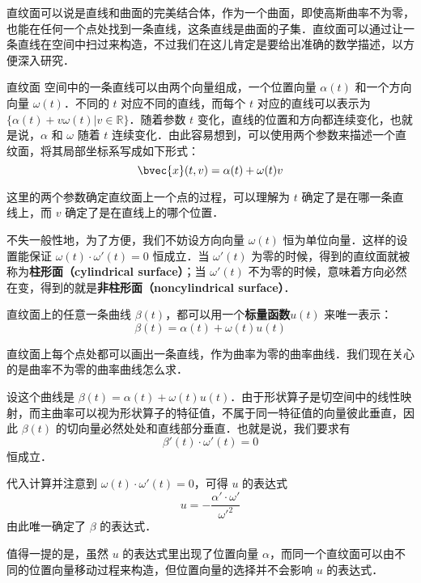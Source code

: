 

直纹面可以说是直线和曲面的完美结合体，作为一个曲面，即使高斯曲率不为零，也能在任何一个点处找到一条直线，这条直线是曲面的子集．直纹面可以通过让一条直线在空间中扫过来构造，不过我们在这儿肯定是要给出准确的数学描述，以方便深入研究．

\begin{definition}{直纹面}
空间中的一条直线可以由两个向量组成，一个位置向量 $\alpha(t)$ 和一个方向向量 $\omega(t)$．不同的 $t$ 对应不同的直线，而每个 $t$ 对应的直线可以表示为 $\{\alpha(t)+v\omega(t)|v\in\mathbb{R}\}$．随着参数 $t$ 变化，直线的位置和方向都连续变化，也就是说，$\alpha$ 和 $\omega$ 随着 $t$ 连续变化．由此容易想到，可以使用两个参数来描述一个直纹面，将其局部坐标系写成如下形式：
\begin{equation}
\bvec{x}(t, v)=\alpha(t)+\omega(t)v
\end{equation}
\end{definition}


这里的两个参数确定直纹面上一个点的过程，可以理解为 $t$ 确定了是在哪一条直线上，而 $v$ 确定了是在直线上的哪个位置．

不失一般性地，为了方便，我们不妨设方向向量 $\omega(t)$ 恒为单位向量．这样的设置能保证 $\omega(t)\cdot\omega'(t)=0$ 恒成立．当 $\omega'(t)$ 为零的时候，得到的直纹面就被称为\textbf{柱形面（cylindrical surface）}；当 $\omega'(t)$ 不为零的时候，意味着方向必然在变，得到的就是\textbf{非柱形面（noncylindrical surface）}．

直纹面上的任意一条曲线 $\beta(t)$，都可以用一个\textbf{标量函数}$u(t)$ 来唯一表示：\begin{equation}
\beta(t)=\alpha(t)+\omega(t)u(t)
\end{equation}

直纹面上每个点处都可以画出一条直线，作为曲率为零的曲率曲线．我们现在关心的是曲率不为零的曲率曲线怎么求．

设这个曲线是 $\beta(t)=\alpha(t)+\omega(t)u(t)$．由于形状算子是切空间中的线性映射，而主曲率可以视为形状算子的特征值，不属于同一特征值的向量彼此垂直，因此 $\beta(t)$ 的切向量必然处处和直线部分垂直．也就是说，我们要求有
\begin{equation}
\beta'(t)\cdot\omega'(t)=0
\end{equation}
恒成立．

代入计算并注意到 $\omega(t)\cdot\omega'(t)=0$，可得 $u$ 的表达式\begin{equation}
u=-\frac{\alpha'\cdot\omega'}{\omega'^2}
\end{equation}
由此唯一确定了 $\beta$ 的表达式．

值得一提的是，虽然 $u$ 的表达式里出现了位置向量 $\alpha$，而同一个直纹面可以由不同的位置向量移动过程来构造，但位置向量的选择并不会影响 $u$ 的表达式．




